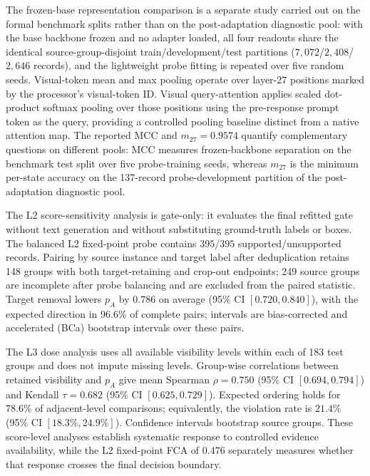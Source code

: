 \documentclass[letterpaper]{article}
\begin{document}
The frozen-base representation comparison is a separate study carried out on the formal benchmark splits rather than on the post-adaptation diagnostic pool: with the base backbone frozen and no adapter loaded, all four readouts share the identical source-group-disjoint train/development/test partitions ($7{,}072$/$2{,}408$/$2{,}646$ records), and the lightweight probe fitting is repeated over five random seeds. Visual-token mean and max pooling operate over layer-27 positions marked by the processor's visual-token ID. Visual query-attention applies scaled dot-product softmax pooling over those positions using the pre-response prompt token as the query, providing a controlled pooling baseline distinct from a native attention map. The reported MCC and $m_{27}=0.9574$ quantify complementary questions on different pools: MCC measures frozen-backbone separation on the benchmark test split over five probe-training seeds, whereas $m_{27}$ is the minimum per-state accuracy on the 137-record probe-development partition of the post-adaptation diagnostic pool.

The L2 score-sensitivity analysis is gate-only: it evaluates the final refitted gate without text generation and without substituting ground-truth labels or boxes. The balanced L2 fixed-point probe contains $395/395$ supported/unsupported records. Pairing by source instance and target label after deduplication retains 148 groups with both target-retaining and crop-out endpoints; 249 source groups are incomplete after probe balancing and are excluded from the paired statistic. Target removal lowers $p_A$ by $0.786$ on average (95\% CI $[0.720,0.840]$), with the expected direction in $96.6\%$ of complete pairs; intervals are bias-corrected and accelerated (BCa) bootstrap intervals over these pairs.

The L3 dose analysis uses all available visibility levels within each of 183 test groups and does not impute missing levels. Group-wise correlations between retained visibility and $p_A$ give mean Spearman $\rho=0.750$ (95\% CI $[0.694,0.794]$) and Kendall $\tau=0.682$ (95\% CI $[0.625,0.729]$). Expected ordering holds for $78.6\%$ of adjacent-level comparisons; equivalently, the violation rate is $21.4\%$ (95\% CI $[18.3\%,24.9\%]$). Confidence intervals bootstrap source groups. These score-level analyses establish systematic response to controlled evidence availability, while the L2 fixed-point FCA of $0.476$ separately measures whether that response crosses the final decision boundary.
\end{document}
